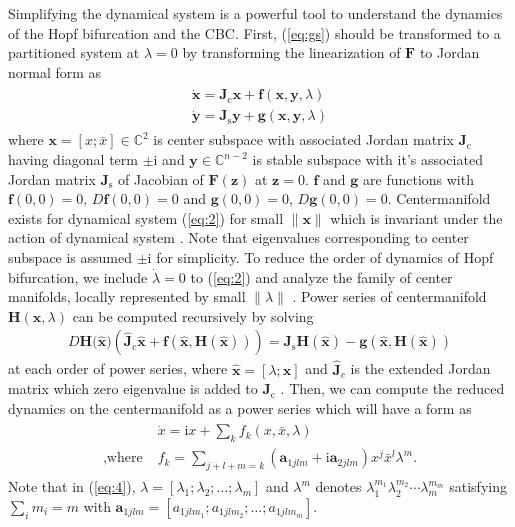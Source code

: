 \documentclass[openacc]{rsproca_new}%
\def\complex{\mathbb{C}}
\def\vec#1{\ensuremath{\mathbf{#1}}}
\newcommand{\Eref}[1]{(\ref{#1})}
\begin{document}
Simplifying the dynamical system is a powerful tool to understand the dynamics of the Hopf bifurcation and the CBC. First, \Eref{eq:gs} should be transformed to a partitioned system at \(\lambda=0\) by transforming the linearization of \(\vec{F}\) to Jordan normal form as
\begin{align}\label{eq:2}
  \begin{split}
    \dot{\vec{x}} =\vec{J}_\textrm{c} \vec{x} + \vec{f}(\vec{x},\vec{y},\lambda)\\
    \dot{\vec{y}} =\vec{J}_\textrm{s} \vec{y} +\vec{g}(\vec{x},\vec{y},\lambda)
  \end{split}
\end{align}
where $\vec{x}=[x;\bar{x}]\in \complex^2$ is center subspace with associated Jordan matrix $\vec{J}_\textrm{c}$ having diagonal term $\pm\textrm{i}$ and $\vec{y}\in \complex^{n-2}$ is stable subspace with it's associated Jordan matrix $\vec{J}_\textrm{s}$ of Jacobian of $\vec{F}(\vec{z})$ at $\vec{z}=0$.
$\vec{f}$ and $\vec{g}$ are functions with $\vec{f}(0,0)=0$, $D\vec{f}(0,0)=0$ and $\vec{g}(0,0)=0$, $D\vec{g}(0,0)=0$. Centermanifold exists for dynamical system \Eref{eq:2} for small  $\|\vec{x}\|$ which is invariant under the action of dynamical system \cite{carr2012applications}. Note that eigenvalues corresponding to center subspace is assumed $\pm\textrm{i}$ for simplicity. To reduce the order of dynamics of Hopf bifurcation, we include $\dot\lambda=0$ to \Eref{eq:2} and analyze the family of center manifolds, locally represented by small $\|\lambda\|$  \cite{kuznetsov2013elements}. Power series of centermanifold $\vec{H}(\vec{x},\lambda)$ can be computed recursively by solving
\begin{align}\label{eq:3}
    D\vec{H}({\vec{\hat{x})}}(\vec{\hat{J}}_\textrm{c}\vec{\hat{x}}+\vec{f}(\vec{\hat{x}},\vec{H}(\vec{\hat{x}}))) =\vec{J}_\textrm{s} \vec{H}(\vec{\hat{x}})-\vec{g}(\vec{\hat{x}},\vec{H}(\vec{\hat {x}}))
\end{align}
at each order of power series, where \(\vec{\hat{x}}=[\lambda;\vec{x}]\) and \(\vec{\hat{J}}_c\) is the extended Jordan matrix which zero eigenvalue is added to \(\vec{J}_\textrm{c}\) \cite{bi1999symbolic}. Then, we can compute the reduced dynamics on the centermanifold as a power series which will have a form as
\begin{align}\label{eq:4}
  \begin{split}
    {}&\dot{x} =\textrm{i} x+\sum_k f_k(x,\bar{x},\lambda)\\
    ,\textrm{where} \; & f_k=\sum_{j+l+m=k}(\vec{a}_{1jlm}+\textrm{i}\vec{a}_{2jlm})x^j\bar{x}^l\lambda^m.
  \end{split}
\end{align}
Note that in \Eref{eq:4}, \(\lambda=[\lambda_1;\lambda_2;\ldots;\lambda_m]\) and \(\lambda^m\) denotes \(\lambda_1^{m_1}\lambda_2^{m_2}\cdots\lambda_m^{m_m}\) satisfying \(\sum_i m_i = m\) with \(\vec{a}_{1jlm}=[a_{1jlm_1};a_{1jlm_2};\ldots;a_{1jlm_m}]\).
\end{document}
